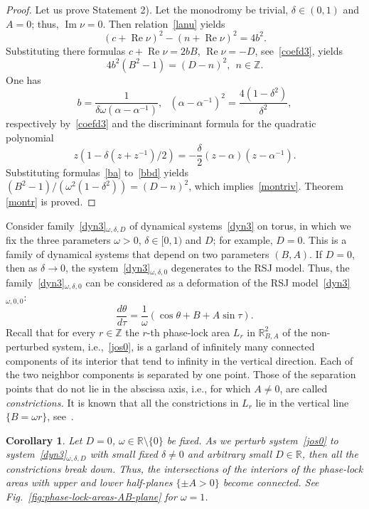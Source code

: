 \documentclass[preprint,12pt]{elsarticle}
\theoremstyle{plain}
\newtheorem{corollary}[theorem]{Corollary}
\DeclareMathOperator{\im}{\mathrm{Im}}
\DeclareMathOperator{\re}{\mathrm{Re}}
\numberwithin{equation}{section}
\numberwithin{equation}{section}
\begin{document}
\begin{proof}
Let us prove Statement 2). Let the monodromy be trivial, $\delta\in(0,1)$ and $A=0$; thus, 
$\im\nu=0$. 
Then relation~\eqref{lanu} yields
$$(c+\re\nu)^2-(n+\re\nu)^2=4b^2.$$
Substituting there formulas $c+\re\nu=2bB$, $\re\nu=-D$, see~\eqref{coefd3}, yields
\begin{equation}4b^2(B^2-1)=(D-n)^2, \ \ n\in\mathbb{Z}.\label{bbd}\end{equation}
One has
\begin{equation}b=\frac1{\delta \omega(\alpha-\alpha^{-1})}, \ \ \ (\alpha-\alpha^{-1})^2=\frac{4(1-\delta^2)}{\delta^2},\label{ba}\end{equation} 
respectively by~\eqref{coefd3} and the discriminant formula for the quadratic polynomial $$z(1-\delta(z+z^{-1})/2)=-\frac{\delta}2(z-\alpha)(z-\alpha^{-1}).$$
Substituting formulas~\eqref{ba} to~\eqref{bbd} yields $(B^2-1)/(\omega^2(1-\delta^2))=(D-n)^2$, which implies~\eqref{montriv}. Theorem \ref{montr} is proved.
\end{proof}

Consider family~\eqref{dyn3}$_{\omega, \delta,  D}$ of dynamical systems~\eqref{dyn3} on torus, in which we fix the three parameters $\omega>0$, $\delta\in[0,1)$ and $D$; for example, $D=0$. 
This is a family of dynamical systems that depend on two parameters $(B,A)$. 
If $D=0$, then as $\delta\to0$, the system~\eqref{dyn3}$_{\omega, \delta,  0}$ degenerates to the RSJ model. Thus, the family~\eqref{dyn3}$_{\omega, \delta,  0}$ can be considered as a deformation of the RSJ model~\eqref{dyn3}$_{\omega, 0,  0}$: 
\begin{equation}\frac{d\theta}{d\tau}=\frac1{\omega}(\cos\theta+B+A\sin\tau).\label{jos0}
\end{equation} 
Recall that for every $r\in\mathbb{Z}$ the $r$-th phase-lock area $L_r$ in $\mathbb{R}^2_{B,A}$ of the non-perturbed system, i.e.,~\eqref{jos0}, is a garland of infinitely many connected components of its interior that tend to infinity in the vertical direction.  Each of the two neighbor components is separated by one point. Those of the separation points that do not lie in the abscissa axis, i.e., for which $A\neq0$, are called {\it constrictions.} It is known that all the constrictions in $L_r$ lie in the vertical line $\{ B=\omega r\}$, see~\cite{bibilo2022families}.
 
\begin{corollary} \label{cmontr} Let $D=0$, $\omega\in\mathbb R\setminus\{0\}$ be fixed. As we perturb system~\eqref{jos0} to system~\eqref{dyn3}$_{\omega, \delta,  D}$ with small fixed $\delta\neq0$ and arbitrary small $D\in\mathbb R$, then all the constrictions break down. Thus, the intersections of the interiors of the phase-lock areas with upper and  lower half-planes $\{\pm A>0\}$ become connected. See Fig.~\ref{fig:phase-lock-areas-AB-plane} for $\omega=1$.
\end{corollary}
\end{document}
